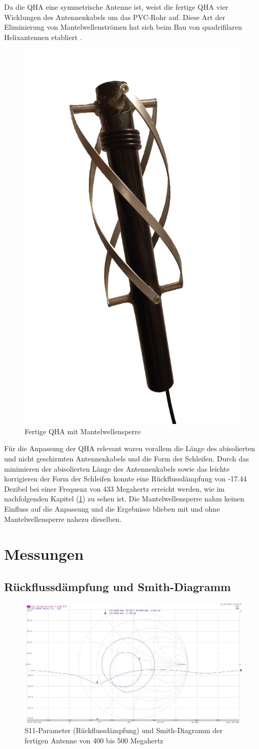 Da die QHA eine symmetrische Antenne ist, weist die fertige QHA vier Wicklungen des Antennenkabels um das PVC-Rohr auf. Diese Art der Eliminierung von Mantelwellenströmen hat sich beim Bau von quadrifilaren Helixantennen etabliert \cite{noauthor_quadrifilar_nodate}. 

\begin{figure} [H]
	\centering
	\includegraphics[width=.25\linewidth]{../ref/qha_fertig.png}
	\caption{Fertige QHA mit Mantelwellensperre}
	\label{fig:fertig_qha}
\end{figure}

Für die Anpassung der QHA relevant waren vorallem die Länge des abisolierten und nicht geschirmten Antennenkabels und die Form der Schleifen. Durch das minimieren der abisolierten Länge des Antennenkabels sowie das leichte korrigieren der Form der Schleifen konnte eine Rückflussdämpfung von -17.44 Dezibel bei einer Frequenz von 433 Megahertz erreicht werden, wie im nachfolgenden Kapitel (\ref{sec:messungen_qha}) zu sehen ist. Die Mantelwellensperre nahm keinen Einfluss auf die Anpassung und die Ergebnisse blieben mit und ohne Mantelwellensperre nahezu dieselben. 

\section{Messungen}
\label{sec:messungen_qha}
\subsection{Rückflussdämpfung und Smith-Diagramm}
\begin{figure} [H]
	\centering
	\includegraphics[width=\linewidth]{../ref/qfh_s11.png}
	\caption{S11-Parameter (Rückflussdämpfung) und Smith-Diagramm der fertigen Antenne von 400 bis 500 Megahertz}
	\label{fig:fertig_qha}
\end{figure}

